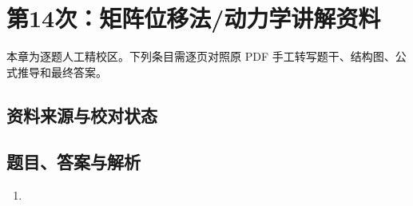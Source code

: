 \chapter{第14次：矩阵位移法/动力学讲解资料}

本章为逐题人工精校区。下列条目需逐页对照原 PDF 手工转写题干、结构图、公式推导和最终答案。

\section{资料来源与校对状态}


\section{题目、答案与解析}

\begin{enumerate}[label=\textbf{第\arabic*题},wide]
  \item
  \begin{problemBox}
  \end{problemBox}

  \begin{solutionBox}
  \end{solutionBox}
\end{enumerate}
